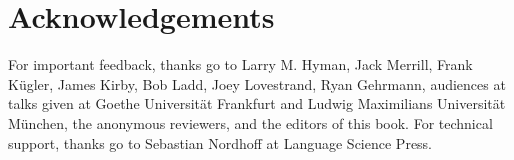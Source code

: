 \documentclass[output=paper,colorlinks,citecolor=brown,draft,draftmode]{langscibook}
\begin{document}
\section*{Acknowledgements}
For  important feedback,
thanks go to 
Larry M. Hyman, 
Jack Merrill, 
Frank Kügler,
James Kirby,
Bob Ladd,
Joey Lovestrand, 
Ryan Gehrmann,
audiences at talks given at Goethe Universität Frankfurt and Ludwig Maximilians Universität München,
the anonymous reviewers, and
the editors of this book.
For technical support, thanks go to Sebastian Nordhoff at Language Science Press.

\printbibliography[heading=subbibliography,notkeyword=this]
\end{document}
